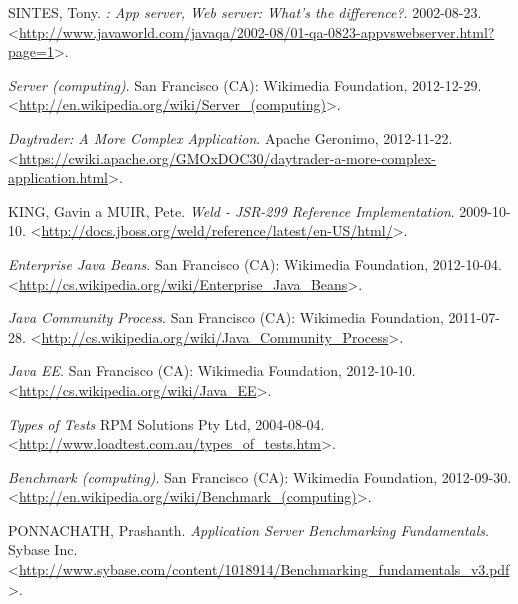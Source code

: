 \documentclass[122pt,oneside]{fithesis}
\begin{document}
\begin{thebibliography}{99}
SINTES, Tony.
\emph{: App server, Web server: What's the difference?}.
2002-08-23.
\textless\href{http://www.javaworld.com/javaqa/2002-08/01-qa-0823-appvswebserver.html?page=1}{http://www.javaworld.com/javaqa/2002-08/01-qa-0823-appvswebserver.html?page=1}\textgreater.

\emph{Server (computing)}.
San Francisco (CA): Wikimedia Foundation, 2012-12-29.
\textless\href{http://en.wikipedia.org/wiki/Server\_(computing)}{http://en.wikipedia.org/wiki/Server\_(computing)}\textgreater.

\emph{Daytrader: A More Complex Application}.
Apache Geronimo, 2012-11-22.
\textless\href{https://cwiki.apache.org/GMOxDOC30/daytrader-a-more-complex-application.html}{https://cwiki.apache.org/GMOxDOC30/daytrader-a-more-complex-application.html}\textgreater.

KING, Gavin a MUIR, Pete.
\emph{Weld - JSR-299 Reference Implementation}.
2009-10-10.
\textless\href{http://docs.jboss.org/weld/reference/latest/en-US/html/}{http://docs.jboss.org/weld/reference/latest/en-US/html/}\textgreater.

\emph{Enterprise Java Beans}.
San Francisco (CA): Wikimedia Foundation, 2012-10-04.
\textless\href{http://cs.wikipedia.org/wiki/Enterprise\_Java\_Beans}{http://cs.wikipedia.org/wiki/Enterprise\_Java\_Beans}\textgreater.

\emph{Java Community Process}.
San Francisco (CA): Wikimedia Foundation, 2011-07-28.
\textless\href{http://cs.wikipedia.org/wiki/Java\_Community\_Process}{http://cs.wikipedia.org/wiki/Java\_Community\_Process}\textgreater.

\emph{Java EE}.
San Francisco (CA): Wikimedia Foundation, 2012-10-10.
\textless\href{http://cs.wikipedia.org/wiki/Java\_EE}{http://cs.wikipedia.org/wiki/Java\_EE}\textgreater.

\emph{Types of Tests}
RPM Solutions Pty Ltd, 2004-08-04.
\textless\href{http://www.loadtest.com.au/types\_of\_tests.htm}{http://www.loadtest.com.au/types\_of\_tests.htm}\textgreater.

\emph{Benchmark (computing)}.
San Francisco (CA): Wikimedia Foundation, 2012-09-30.
\textless\href{http://en.wikipedia.org/wiki/Benchmark\_(computing)}{http://en.wikipedia.org/wiki/Benchmark\_(computing)}\textgreater.

PONNACHATH, Prashanth.
\emph{Application Server Benchmarking Fundamentals}.
Sybase Inc.
\textless\href{http://www.sybase.com/content/1018914/Benchmarking\_fundamentals\_v3.pdf}{http://www.sybase.com/content/1018914/Benchmarking\_fundamentals\_v3.pdf}\textgreater.


\end{thebibliography}
\end{document}
